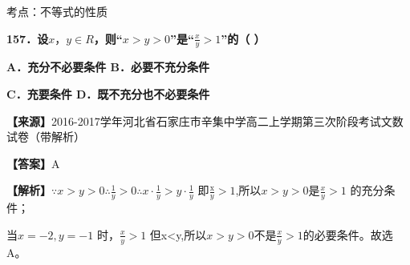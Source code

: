 考点：不等式的性质

\textbf{157．设}\(x，y \in R\)\textbf{，则``}\(x > y > 0\)\textbf{''是``}\(\frac{x}{y} > 1\)\textbf{''的（
）}

\textbf{A．充分不必要条件 B．必要不充分条件}

\textbf{C．充要条件 D．既不充分也不必要条件}

\textbf{【来源】}2016-2017学年河北省石家庄市辛集中学高二上学期第三次阶段考试文数试卷（带解析）

\textbf{【答案】}A

\textbf{【解析】}\(\because x > y > 0\therefore\frac{1}{y} > 0\therefore x \cdot \frac{1}{y} > y \cdot \frac{1}{y}\)
即\(\frac{\text{x}}{y} > 1\),所以\(x > y > 0\)是\(\frac{x}{y} > 1\)
的充分条件；

当\(x = - 2,y = - 1\) 时，\(\frac{x}{y} > 1\)
但x\textless y,所以\(x > y > 0\)不是\(\frac{x}{y} > 1\)的必要条件。故选A。

